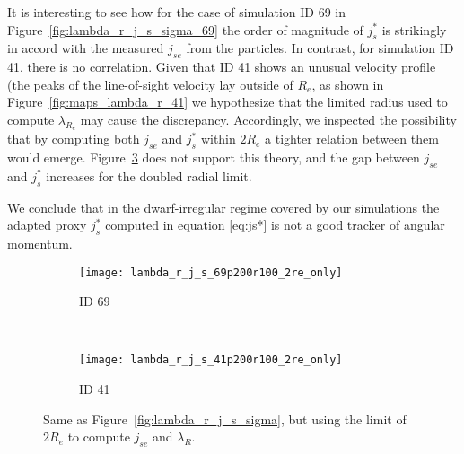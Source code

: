 It is interesting to see how for the case of simulation ID 69 in Figure~\ref{fig:lambda_r_j_s_sigma_69} the order of magnitude of $j_s^*$ is strikingly in accord with the measured $j_{se}$ from the particles.
In contrast, for simulation ID 41, there is no correlation.
Given that ID 41 shows an unusual velocity profile (the peaks of the line-of-sight velocity lay outside of $R_e$, as shown in Figure~\ref{fig:maps_lambda_r_41} we hypothesize that the limited radius used to compute $\lambda_{R_e}$ may cause the discrepancy.
Accordingly, we inspected the possibility that by computing both $j_{se}$ and $j_s^*$ within $2 R_e$ a tighter relation between them would emerge.
Figure~\ref{fig:lambda_2r_j_s_sigma} does not support this theory, and the gap between $j_{se}$ and $j_s^*$ increases for the doubled radial limit.

We conclude that in the dwarf-irregular regime covered by our simulations the adapted proxy $j_s^*$ computed in equation \eqref{eq:js*} is not a good tracker of angular momentum.



\begin{figure}
  \centering
  \begin{subfigure}[t]{\textwidth}
    \centering
    \caption{ID 69}
    \label{fig:lambda_2r_j_s_sigma_69}
    \texttt{[image: lambda\_r\_j\_s\_69p200r100\_2re\_only]}
  \end{subfigure}\\
  \begin{subfigure}[t]{\textwidth}
    \centering
    \caption{ID 41}
    \label{fig:lambda_2r_j_s_sigma_41}
    \texttt{[image: lambda\_r\_j\_s\_41p200r100\_2re\_only]}
  \end{subfigure}
  \caption{Same as Figure~\ref{fig:lambda_r_j_s_sigma}, but using the limit of $2 R_e$ to compute $j_{se}$ and $\lambda_R$.}
  \label{fig:lambda_2r_j_s_sigma}
\end{figure}

%


%
